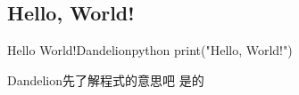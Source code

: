 \documentclass{article}
\begin{document}

\begin{large}

\section{Hello, World!}
\begin{mintbox}{Hello World!}{Dandelion}{python}
print("Hello, World!")
\end{mintbox}

\begin{boxpar}{Dandelion}{先了解程式的意思吧}
    是的
\end{boxpar}

\end{large}
\end{document}
